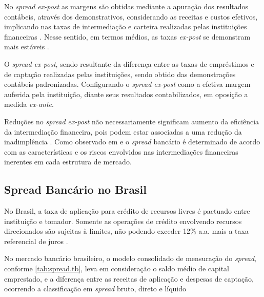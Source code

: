 \documentclass[12pt,12pt,openright,oneside,a4paper,chapter=TITLE,section=TITLE,subsection=TITLE,subsubsection=TITLE,english,french,spanish,portugues,sumario=tradicional]{abntex2}
\begin{document}
No \emph{spread ex-post} as margens são obtidas mediante a apuração dos resultados
contábeis, através dos demonstrativos, considerando as receitas e custos
efetivos, implicando nas taxas de intermediação e carteira realizadas pelas
instituições financeiras \cite{kunt:1999, durigan:2018}. Nesse sentido, em
termos médios, as taxas \emph{ex-post} se demonstram mais estáveis \cite{leal:2006, dantas:2012}.

O \emph{spread ex-post}, sendo resultante da diferença entre as taxas de empréstimos e de captação realizadas pelas instituições, sendo obtido das demonstrações contábeis padronizadas. Configurando o \emph{spread ex-post} como a efetiva margem auferida pela instituição, diante seus resultados contabilizados, em oposição a medida \emph{ex-ante}\cite{dantas:2012}.

Reduções no \emph{spread} \emph{ex-post} não necessariamente significam aumento da
eficiência da intermediação financeira, pois podem estar associadas a uma
redução da inadimplência \cite{kunt:1999}. Como observado em
\textcite{klein:1971} e \textcite{ho-saunders:1981} o \emph{spread} bancário é
determinado de acordo com as características e os riscos envolvidos nas
intermediações financeiras inerentes em cada estrutura de mercado.

\subsection{Spread Bancário no Brasil}

No Brasil, a taxa de aplicação para crédito de recursos livres é pactuado entre
instituição e tomador. Somente as operações de crédito envolvendo recursos
direcionados são sujeitas à limites, não podendo exceder 12\% a.a. mais a taxa
referencial de juros \cite{BCB:2016}.

No mercado bancário brasileiro, o modelo consolidado de mensuração do \emph{spread},
conforme \autoref{tab:spread.tb}, leva em consideração o saldo médio de capital
emprestado, e a diferença entre as receitas de aplicação e despesas de
captação, ocorrendo a classificação em \emph{spread} bruto, direto e líquido
\cite{fipecafi:2005}
\end{document}
